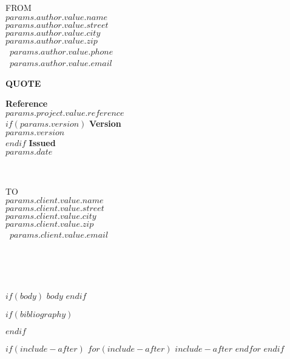 \documentclass[
11pt,
a4paper,
twoside,
]{article}
\begin{document}
\vspace{0pt}
\begin{minipage}[t]{0.5\textwidth}
  \vspace{0pt}
  \begin{flushleft}
    \uppercase{From}                      \\
    \textbf{$params.author.value.name$}   \\
    $params.author.value.street$          \\
    $params.author.value.city$            \\
    $params.author.value.zip$             \\
    \faPhone\ $params.author.value.phone$ \\
    \faEnvelopeO\ $params.author.value.email$
  \end{flushleft}
\end{minipage}
\hfill
\begin{minipage}[t]{0.5\textwidth}
  \vspace{0pt}
  \begin{flushright}
    {\LARGE\bfseries\uppercase{Quote}}

    {\bfseries Reference}               \\
    $params.project.value.reference$ \\
    $if(params.version)$
    {\bfseries Version}                 \\
    $params.version$              \\
    $endif$
    {\bfseries Issued}                    \\
    $params.date$
  \end{flushright}
\end{minipage}\\[\baselineskip]
\begin{minipage}{1\textwidth}
  \begin{flushleft}
    \uppercase{To}\\
    \textbf{$params.client.value.name$}\\
    $params.client.value.street$\\
    $params.client.value.city$\\
    $params.client.value.zip$\\
    \faEnvelopeO\ $params.client.value.email$
  \end{flushleft}
\end{minipage}\\

\begin{center}
  {\large\bfseries{}}\\
  {\itshape{}}
\end{center}

$if(body)$
$body$
$endif$

$if(bibliography)$
\clearpage

$endif$

$if(include-after)$
\clearpage
$for(include-after)$
$include-after$
$endfor$
$endif$
\end{document}

